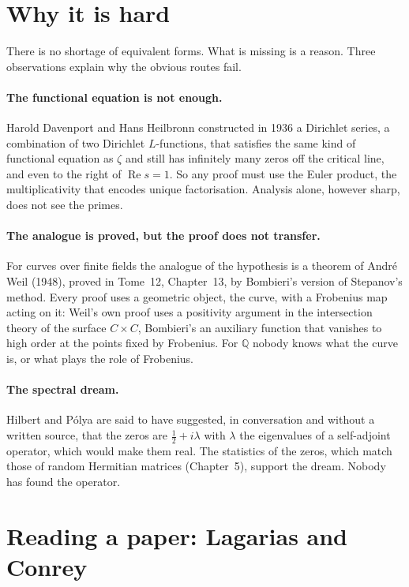 \section{Why it is hard}

There is no shortage of equivalent forms. What is missing is a reason. Three observations explain why the obvious routes fail.

\paragraph{The functional equation is not enough.} Harold Davenport and Hans Heilbronn constructed in 1936 a Dirichlet series, a combination of two
Dirichlet $L$-functions, that satisfies the same kind of functional equation as $\zeta$ and still has infinitely many zeros off the critical line, and even
to the right of $\operatorname{Re}s=1$. So any proof must use the Euler product, the multiplicativity that encodes unique factorisation. Analysis alone,
however sharp, does not see the primes.

\paragraph{The analogue is proved, but the proof does not transfer.} For curves over finite fields the analogue of the hypothesis is a theorem of
Andr\'e Weil (1948), proved in Tome~12, Chapter~13, by Bombieri's version of Stepanov's method. Every proof uses a geometric object, the curve, with a
Frobenius map acting on it: Weil's own proof uses a positivity argument in the intersection theory of the surface $C\times C$, Bombieri's an auxiliary
function that vanishes to high order at the points fixed by Frobenius. For $\mathbb Q$ nobody knows what the curve is, or what plays the role of
Frobenius.

\paragraph{The spectral dream.} Hilbert and P\'olya are said to have suggested, in conversation and without a written source, that the zeros are
$\frac12+i\lambda$ with $\lambda$ the eigenvalues of a self-adjoint operator, which would make them real. The statistics of the zeros, which match
those of random Hermitian matrices (Chapter~5), support the dream. Nobody has found the operator.

\section{Reading a paper: Lagarias and Conrey}

